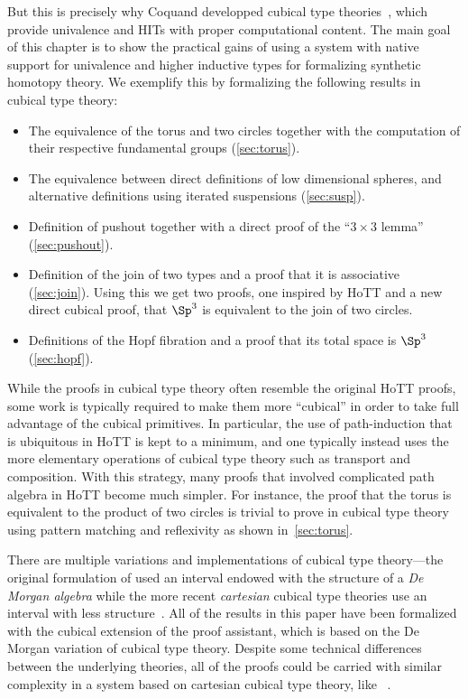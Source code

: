 But this is precisely why Coquand \etal developped cubical type 
theories~\cite{CCHM,AngiuliHouHarper18,ABCFHL}, which provide univalence 
and HITs with proper computational content. 
% 
The main goal of this chapter is to show the practical gains of using a
system with native support for univalence and higher inductive types
for formalizing synthetic homotopy theory. We exemplify this by
formalizing the following results in cubical type theory:
%
\begin{itemize}
\item The equivalence of the torus and two circles together with the
  computation of their respective fundamental groups
  (\cref{sec:torus}).
\item The equivalence between direct definitions of low dimensional
  spheres, and alternative definitions using iterated suspensions
  (\cref{sec:susp}).
\item Definition of pushout together with a direct proof of the ``$3
  \times 3$ lemma'' (\cref{sec:pushout}).
\item Definition of the join of two types and a proof that it is
  associative (\cref{sec:join}). Using this we get two proofs, one
  inspired by HoTT and a new direct cubical proof, that $\Sp^3$ is
  equivalent to the join of two circles.
\item Definitions of the Hopf fibration and a proof that its total
  space is $\Sp^3$ (\cref{sec:hopf}).
\end{itemize}

While the proofs in cubical type theory often resemble the original
HoTT proofs, some work is typically required to make them more
``cubical'' in order to take full advantage of the cubical
primitives. 
% 
In particular, the use of path-induction that is
ubiquitous in HoTT is kept to a minimum, and one typically instead
uses the more elementary operations of cubical type theory such as
transport and composition.
% 
With this strategy, many proofs that involved complicated path algebra in HoTT become 
much simpler. 
% 
For instance, the proof that the torus is equivalent to the product of two 
circles is trivial to prove in cubical type theory using pattern matching and 
reflexivity as shown in~\cref{sec:torus}.

There are multiple variations and implementations of cubical type
theory---the original formulation of  used an interval
endowed with the structure of a \emph{De Morgan algebra} while the
more recent \emph{cartesian} cubical type theories use an interval
with less structure~. 
% 
All of the results in this paper have been formalized with the
cubical extension  of the \Agda{} proof assistant, which 
is based on the De Morgan variation of cubical type theory. 
% 
Despite some technical differences between the underlying theories, all of 
the proofs could be carried with similar complexity in a system based on 
cartesian cubical type theory, like \redtt{}~.

